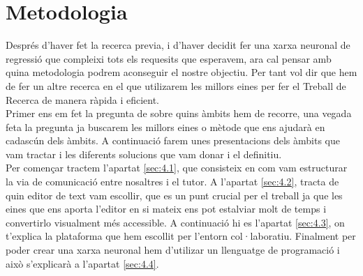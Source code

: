 \chapter{Metodologia}
\label{c:Metodologia}
Després d'haver fet la recerca previa, i d'haver decidit fer una xarxa neuronal de regressió que compleixi tots els requesits que esperavem, ara cal pensar amb quina metodologia podrem aconseguir el nostre objectiu. Per tant vol dir que hem de fer un altre recerca en el que utilizarem les millors eines per fer el Treball de Recerca de manera ràpida i eficient.\\


Primer ens em fet la pregunta de  sobre quins àmbits hem de recorre, una vegada feta la pregunta ja buscarem les millors eines o mètode que ens ajudarà en cadascún dels àmbits. A continuació farem unes presentacions dels àmbits que vam tractar i les diferents solucions que vam donar i el definitiu.\\

Per començar tractem  l'apartat \ref{sec:4.1}, que consisteix en com vam estructurar la via de comunicació entre nosaltres i el tutor. A l'apartat \ref{sec:4.2}, tracta de quin editor de text vam escollir, que es un punt crucial per el treball ja que les eines que ens aporta l'editor en si mateix ens pot estalviar molt de temps i convertirlo visualment més accessible. A continuació hi es l'apartat \ref{sec:4.3}, on t'explica la plataforma que hem escollit per l'entorn col·laboratiu. Finalment per poder crear una xarxa neuronal hem d'utilizar un llenguatge de programació i això s'explicarà a l'apartat \ref{sec:4.4}.




